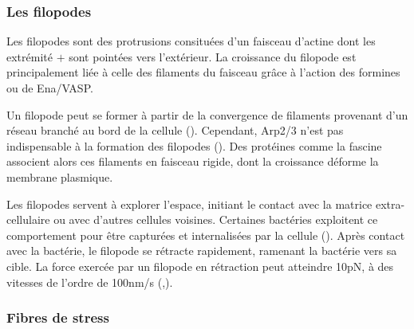 \subsubsection{Les filopodes}

Les filopodes sont des protrusions consituées d'un faisceau d'actine dont les extrémité $+$ sont pointées vers l'extérieur. 
La croissance du filopode est principalement liée à celle des filaments du faisceau grâce à l'action des formines ou de Ena/VASP. 

Un filopode peut se former à partir de la convergence de filaments provenant d'un réseau branché au bord de la cellule (\cite{small_actin_1995}). Cependant, Arp2/3 n'est pas indispensable à la formation des filopodes (\cite{wu_arp2/3_2012}). 
Des protéines comme la fascine associent alors ces filaments en faisceau rigide, dont la croissance déforme la membrane plasmique. 

Les filopodes servent à explorer l'espace, initiant le contact avec la matrice extra-cellulaire ou avec d'autres cellules voisines. 
Certaines bactéries exploitent ce comportement pour être capturées et internalisées par la cellule (\cite{romero_atp-mediated_2011}). 
Après contact avec la bactérie, le filopode se rétracte rapidement, ramenant la bactérie vers sa cible.
La force exercée par un filopode en rétraction peut atteindre 10pN, à des vitesses de l'ordre de 100nm/s (\cite{vonna_micromechanics_2007},\cite{romero_atp-mediated_2011}). 



\subsubsection{Fibres de stress}

